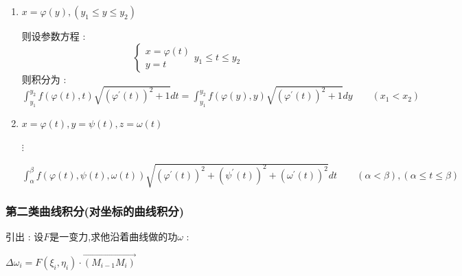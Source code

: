 \documentclass[UTF8,12pt]{ctexbook}
\newcommand{\derivative}{^\prime}
\newcommand{\defFunction}[1]{f(#1)}
\newcommand{\definiteIntegral}[2]{\int^{#1}_{#2}}
\begin{document}
{{{{\begin{enumerate}
{            则积分为 : $\definiteIntegral{x_2}{x_1}\defFunction{t,\varphi(t)}\sqrt{1 + (\varphi\derivative(t))^2}dt = \definiteIntegral{x_2}{x_1}\defFunction{x,\varphi(t)}\sqrt{1 + (\varphi\derivative(x))^2}dx\qquad (x_1 < x_2)$
            }
      \item {
            $x = \varphi(y),(y_1 \leq y \leq y_2)$

            则设参数方程 :
            $$
              \begin{cases}
                x = \varphi(t) \\
                y = t
              \end{cases}
              y_1 \leq t \leq y_2
            $$
            则积分为 : $\definiteIntegral{y_2}{y_1}\defFunction{\varphi(t),t}\sqrt{(\varphi\derivative(t))^2 + 1}dt = \definiteIntegral{y_2}{y_1}\defFunction{\varphi(y),y}\sqrt{(\varphi\derivative(t))^2 + 1}dy\qquad (x_1 < x_2)$
            }
      \item{
            $x = \varphi(t),y = \psi(t),z = \omega(t)$

            $\vdots$

            $\definiteIntegral{\beta}{\alpha}\defFunction{\varphi(t),\psi(t),\omega(t)}\sqrt{(\varphi\derivative(t))^2 + (\psi\derivative(t))^2 + (\omega\derivative(t))^2}dt\qquad (\alpha < \beta),(\alpha \leq t \leq \beta)$
            }
    \end{enumerate}
  }%

  \subsubsection{第二类曲线积分(对坐标的曲线积分)}{
    引出 : 设$F$是一变力,求他沿着曲线做的功$\omega$ :

    \begin{center}
      $\Delta\omega_i = F(\xi_i,\eta_i)\cdot\vec{(M_{i-1}M_i)}$
    \end{center}

}}}}
\end{document}
